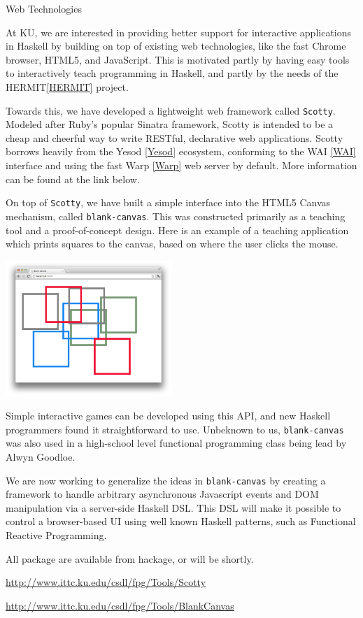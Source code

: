 \begin{hcarentry}{Web Technologies}
\label{kuwebtech}
\makeheader

At KU, we are interested in providing better support for
interactive applications in Haskell by building on top of existing web technologies,
like the fast Chrome browser, HTML5, and JavaScript. This is motivated
partly by having easy tools to interactively teach programming in Haskell,
and partly by the needs of the HERMIT\cref{HERMIT} project.

Towards this, we have developed a lightweight web framework called {\tt Scotty}.
Modeled after Ruby's popular Sinatra framework, Scotty is intended to
be a cheap and cheerful way to write RESTful, declarative web applications.
Scotty borrows heavily from the Yesod \cref{Yesod} ecosystem, conforming
to the WAI \cref{WAI} interface and using the fast Warp \cref{Warp} web server
by default. More information can be found at the link below.

On top of {\tt Scotty}, we have built a simple interface
into the HTML5 Canvas mechanism, called {\tt blank-canvas}.
This was constructed primarily as a teaching tool and
a proof-of-concept design. Here is an example of
a teaching application which prints squares to the canvas,
based on where the user clicks the mouse.

\includegraphics[width=0.47\textwidth]{html/squares.png}

Simple interactive games can be developed using this API,
and new Haskell programmers found it straightforward to use.
Unbeknown to us, {\tt blank-canvas} was also used in a high-school
level functional programming class being lead by Alwyn Goodloe.

We are now working to generalize the ideas in {\tt blank-canvas} by
creating a framework to handle arbitrary asynchronous Javascript events
and DOM manipulation via a server-side Haskell DSL. This DSL will make it possible to control
a browser-based UI using well known Haskell patterns, such as Functional
Reactive Programming.

All package are available from hackage, or will be shortly.

\FurtherReading
\begin{compactitem}
  \item \url{http://www.ittc.ku.edu/csdl/fpg/Tools/Scotty}
  \item \url{http://www.ittc.ku.edu/csdl/fpg/Tools/BlankCanvas}
\end{compactitem}

\end{hcarentry}
